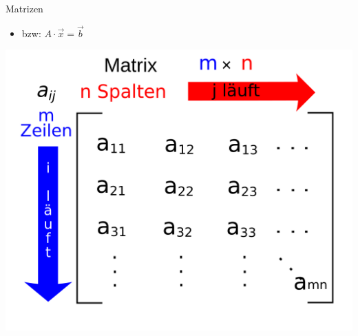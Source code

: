 \documentclass[10pt,aspectratio=169]{beamer}
\begin{document}
\begin{frame}{Matrizen}
\begin{minipage}{9cm}
\begin{itemize}
        \item bzw: $A \cdot \vec{x} = \vec{b}$
      \end{itemize}
    \end{minipage}
    \begin{minipage}{3cm}
      \includegraphics[scale=0.1]{matrix}
    \end{minipage}
  \end{frame}
\end{document}
